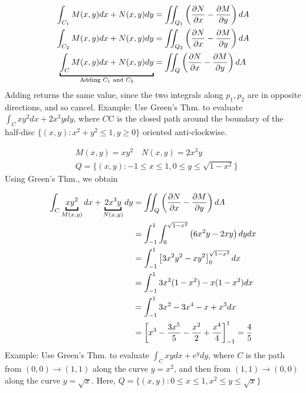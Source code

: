 \documentclass{article}
\newcommand{\nn}{\leavevmode \newline \newline} %
\numberwithin{equation}{subsection} %
\begin{document}
\begin{equation}
    \begin{split}
        \int_{C_1} M(x,y)dx + N(x,y)dy &= \iint_{Q_1} \left( \pdv{N}{x} - \pdv{M}{y}\right)dA \\
        \int_{C_2} M(x,y)dx + N(x,y)dy &= \iint_{Q_2} \left( \pdv{N}{x} - \pdv{M}{y}\right)dA \\
        \underbracket{\int_C M(x,y)dx + N(x,y)dy}_{\text{Adding $C_1$ and $C_2$}} &= \iint_Q \left( \pdv{N}{x} - \pdv{M}{y}\right)dA
    \end{split}
\end{equation}
Adding returns the same value, since the two integrals along $p_1,p_2$ are in opposite directions, and so cancel.
\nn
Example:
Use Green's Thm. to evaluate $\int_C xy^2dx+2x^3ydy$, where $C$C is the closed path around the boundary of the half-disc $\{(x,y):x^2+y^2\leq1,y\geq0\}$ oriented anti-clockwise.

\begin{equation}
    \begin{split}
        &M(x,y) = xy^2 \quad N(x,y) = 2x^3y \\
        &Q = \{ (x,y): -1 \leq x \leq 1 , 0 \leq y \leq \sqrt{1-x^2} \}
    \end{split}
\end{equation}
Using Green's Thm., we obtain

\begin{equation}
    \begin{split}
        \int_C \underbracket{xy^2}_{M(x,y)}dx + \underbracket{2x^3y}_{N(x,y)}dy &= \iint_Q \left( \pdv{N}{x} - \pdv{M}{y} \right) dA \\
        &= \int_{-1}^1 \int_0^{\sqrt{1-x^2}}\left(6x^2y-2xy\right)dydx \\
        &= \int_{-1}^1 \left[ 3x^2y^2 - xy^2 \right]_0^{\sqrt{1-x^2}} dx \\
        &= \int_{-1}^1 3x^2(1-x^2)-x(1-x^2)dx \\
        &= \int_{-1}^1 3x^2-3x^4-x+x^3dx \\
        &= \left[ x^3 - \frac{3x^5}{5} - \frac{x^2}{2} + \frac{x^4}{4} \right]_{-1}^1 = \frac{4}{5}
    \end{split}
\end{equation}
\nn
Example: Use Green's Thm. to evaluate $\int_C xydx + e^ydy$, where $C$ is the path from $(0,0)\to(1,1)$ along the curve $y=x^2$, and then from $(1,1)\to(0,0)$ along the curve $y=\sqrt{x}$. Here, $Q=\{ (x,y): 0 \leq x \leq 1 , x^2 \leq y \leq \sqrt{x} \}$
\end{document}
